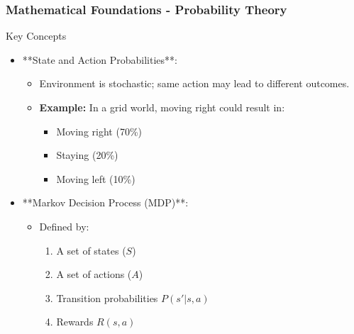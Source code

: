 \documentclass[aspectratio=169]{beamer}
\begin{document}
\begin{frame}[fragile]
    \frametitle{Mathematical Foundations - Probability Theory}
    \begin{block}{Key Concepts}
        \begin{itemize}
            \item **State and Action Probabilities**:
                \begin{itemize}
                    \item Environment is stochastic; same action may lead to different outcomes.
                    \item \textbf{Example:} In a grid world, moving right could result in:
                        \begin{itemize}
                            \item Moving right (70\%)
                            \item Staying (20\%)
                            \item Moving left (10\%)
                        \end{itemize}
                \end{itemize}
            \item **Markov Decision Process (MDP)**:
                \begin{itemize}
                    \item Defined by:
                        \begin{enumerate}
                            \item A set of states (\(S\))
                            \item A set of actions (\(A\))
                            \item Transition probabilities \(P(s' | s, a)\)
                            \item Rewards \(R(s, a)\)
                        \end{enumerate}
                \end{itemize}
        \end{itemize}
    \end{block}
\end{frame}
\end{document}
